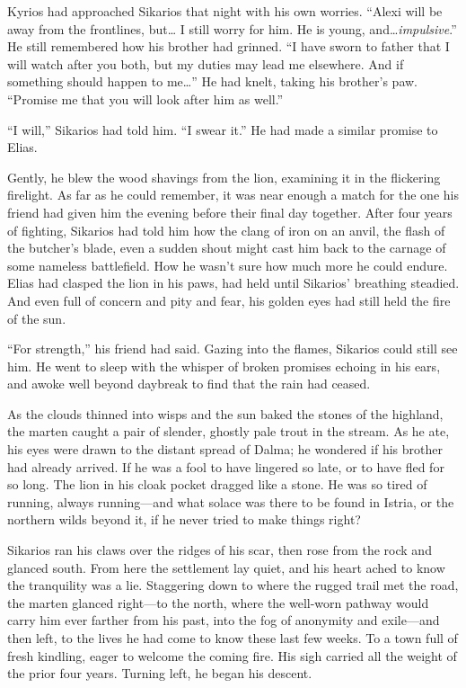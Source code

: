 Kyrios had approached Sikarios that night with his own worries. ``Alexi will be away from the frontlines, but\ldots{} I still worry for him. He is young, and\ldots{}\emph{impulsive}.'' He still remembered how his brother had grinned. ``I have sworn to father that I will watch after you both, but my duties may lead me elsewhere. And if something should happen to me\ldots'' He had knelt, taking his brother's paw. ``Promise me that you will look after him as well.''

``I will,'' Sikarios had told him. ``I swear it.'' He had made a similar promise to Elias.

Gently, he blew the wood shavings from the lion, examining it in the flickering firelight. As far as he could remember, it was near enough a match for the one his friend had given him the evening before their final day together. After four years of fighting, Sikarios had told him how the clang of iron on an anvil, the flash of the butcher's blade, even a sudden shout might cast him back to the carnage of some nameless battlefield. How he wasn't sure how much more he could endure. Elias had clasped the lion in his paws, had held until Sikarios' breathing steadied. And even full of concern and pity and fear, his golden eyes had still held the fire of the sun.

``For strength,'' his friend had said. Gazing into the flames, Sikarios could still see him. He went to sleep with the whisper of broken promises echoing in his ears, and awoke well beyond daybreak to find that the rain had ceased.

As the clouds thinned into wisps and the sun baked the stones of the highland, the marten caught a pair of slender, ghostly pale trout in the stream. As he ate, his eyes were drawn to the distant spread of Dalma; he wondered if his brother had already arrived. If he was a fool to have lingered so late, or to have fled for so long. The lion in his cloak pocket dragged like a stone. He was so tired of running, always running---and what solace was there to be found in Istria, or the northern wilds beyond it, if he never tried to make things right?

Sikarios ran his claws over the ridges of his scar, then rose from the rock and glanced south. From here the settlement lay quiet, and his heart ached to know the tranquility was a lie. Staggering down to where the rugged trail met the road, the marten glanced right---to the north, where the well-worn pathway would carry him ever farther from his past, into the fog of anonymity and exile---and then left, to the lives he had come to know these last few weeks. To a town full of fresh kindling, eager to welcome the coming fire. His sigh carried all the weight of the prior four years. Turning left, he began his descent.


